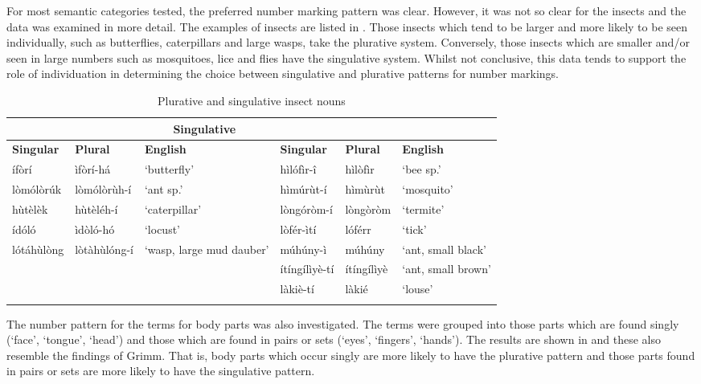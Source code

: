 \documentclass[output=paper]{langsci/langscibook}
\begin{document}
For most semantic categories tested, the preferred number marking pattern was clear. However, it was not so clear for the insects and the data was examined in more detail. The examples of insects are listed in . Those insects which tend to be larger and more likely to be seen individually, such as butterflies, caterpillars and large wasps, take the plurative system. Conversely, those insects which are smaller and/or seen in large numbers such as mosquitoes, lice and flies have the singulative system. Whilst not conclusive, this data tends to support the role of individuation in determining the choice between singulative and plurative patterns for number markings.

\begin{table}
\begin{tabularx}{\textwidth}{llXllX}
\lsptoprule

\multicolumn{3}{c}{\textbf{Plurative}} & \multicolumn{3}{c}{\textbf{Singulative}}\\ \midrule
 \textbf{Singular} & \textbf{Plural} & \textbf{English} & \textbf{Singular} & \textbf{Plural} & \textbf{English}\\ \midrule
 \'{i}f\`{o}r\'{i} &  \`{i}f\`{o}r\'{i}-h\'{a} & ‘butterfly’ &  h\`{i}l\'{o}f\`{i}r-\^{i} &  h\`{i}l\`{o}f\`{i}r & ‘bee sp.’\\
 l\`{o}m\'{o}l\`{o}r\'{u}k &  l\`{o}m\'{o}l\`{o}r\`{u}h-\'{i} & ‘ant sp.’ &  h\`{i}m\'{u}r\`{u}t-\'{i} &  h\`{i}m\`{u}r\`{u}t & ‘mosquito’\\
 h\`{u}t\`{e}l\`{e}k &  h\`{u}t\`{e}l\'{e}h-\'{i} & ‘caterpillar’ &  l\`{o}ng\'{o}r\`{o}m-\'{i} &  l\`{o}ng\`{o}r\`{o}m & ‘termite’\\
 \'{i}d\'{o}l\'{o} &  \`{i}d\`{o}l\'{o}-h\'{o} & ‘locust’ &  l\`{o}f\'{e}r-\`{i}t\'{i} &  l\'{o}f\'{e}rr & ‘tick’\\
 l\'{o}t\'{a}h\`{u}l\`{o}ng &  l\`{o}t\`{a}h\`{u}l\'{o}ng-\'{i} & ‘wasp, large mud dauber’ &  m\'{u}h\'{u}ny-\`{i} &  m\'{u}h\'{u}ny & ‘ant, small black’\\
&  &  &  \'{i}t\'{i}ng\'{i}l\`{i}y\`{e}-t\'{i} &  \'{i}t\'{i}ng\'{i}l\`{i}y\`{e} & ‘ant, small brown’\\
&  &  &  l\`{a}ki\`{e}-t\'{i} &  l\`{a}ki\'{e} & ‘louse’\\
\lspbottomrule
\end{tabularx}
\caption{Plurative and singulative insect nouns}
\label{tab:moodie:7}
\end{table}

The number pattern for the terms for body parts was also investigated. The terms were grouped into those parts which are found singly (‘face’, ‘tongue’, ‘head’) and those which are found in pairs or sets (‘eyes’, ‘fingers’, ‘hands’). The results are shown in  and these also resemble the findings of Grimm.  That is, body parts which occur singly are more likely to have the plurative pattern and those parts found in pairs or sets are more likely to have the singulative pattern. 
\end{document}
